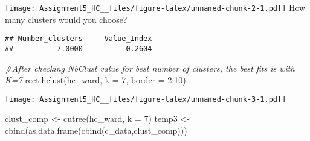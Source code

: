 \documentclass[
]{article}
\newenvironment{Shaded}{\begin{snugshade}}{\end{snugshade}}
\newcommand{\AttributeTok}[1]{\textcolor[rgb]{0.77,0.63,0.00}{#1}}
\newcommand{\CommentTok}[1]{\textcolor[rgb]{0.56,0.35,0.01}{\textit{#1}}}
\newcommand{\DecValTok}[1]{\textcolor[rgb]{0.00,0.00,0.81}{#1}}
\newcommand{\FloatTok}[1]{\textcolor[rgb]{0.00,0.00,0.81}{#1}}
\newcommand{\FunctionTok}[1]{\textcolor[rgb]{0.00,0.00,0.00}{#1}}
\newcommand{\NormalTok}[1]{#1}
\newcommand{\OtherTok}[1]{\textcolor[rgb]{0.56,0.35,0.01}{#1}}
\newcommand{\SpecialCharTok}[1]{\textcolor[rgb]{0.00,0.00,0.00}{#1}}
\newcommand{\StringTok}[1]{\textcolor[rgb]{0.31,0.60,0.02}{#1}}
\begin{document}
\texttt{[image: Assignment5\_HC\_\_files/figure-latex/unnamed-chunk-2-1.pdf]}
How many clusters would you choose?

\begin{Shaded}
\end{Shaded}

\begin{verbatim}
## Number_clusters     Value_Index 
##          7.0000          0.2604
\end{verbatim}

\begin{Shaded}
\begin{Highlighting}[]
\CommentTok{\#After checking NbClust value for best number of clusters, the best fits is with K=7}
\FunctionTok{rect.hclust}\NormalTok{(hc\_ward, }\AttributeTok{k =} \DecValTok{7}\NormalTok{, }\AttributeTok{border =} \DecValTok{2}\SpecialCharTok{:}\DecValTok{10}\NormalTok{)}
\end{Highlighting}
\end{Shaded}

\texttt{[image: Assignment5\_HC\_\_files/figure-latex/unnamed-chunk-3-1.pdf]}

\begin{Shaded}
\begin{Highlighting}[]
\NormalTok{clust\_comp }\OtherTok{\textless{}{-}} \FunctionTok{cutree}\NormalTok{(hc\_ward, }\AttributeTok{k =} \DecValTok{7}\NormalTok{)}
\NormalTok{temp3 }\OtherTok{\textless{}{-}} \FunctionTok{cbind}\NormalTok{(}\FunctionTok{as.data.frame}\NormalTok{(}\FunctionTok{cbind}\NormalTok{(c\_data,clust\_comp)))}
\end{Highlighting}
\end{Shaded}
\end{document}
